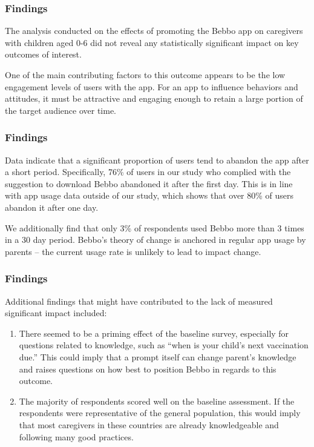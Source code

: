 \documentclass[aspectratio=169]{beamer}
\begin{document}
\begin{frame}
\frametitle{Findings}

The analysis conducted on the effects of promoting the Bebbo app on caregivers with children aged 0-6 did not reveal any statistically significant impact on key outcomes of interest. 

One of the main contributing factors to this outcome appears to be the low engagement levels of users with the app. For an app to influence behaviors and attitudes, it must be attractive and engaging enough to retain a large portion of the target audience over time. 



\end{frame}

\begin{frame}
   \frametitle{Findings}

Data indicate that a significant proportion of users tend to abandon the app after a short period. Specifically, 76\% of users in our study who complied with the suggestion to download Bebbo abandoned it after the first day. This is in line with app usage data outside of our study, which shows that over 80\% of users abandon it after one day. 

We additionally find that only 3\% of respondents used Bebbo more than 3 times in a 30 day period. Bebbo’s theory of change is anchored in regular app usage by parents – the current usage rate is unlikely to lead to impact change.

\end{frame}

\begin{frame}
   \frametitle{Findings}
  Additional findings that might have contributed to the lack of measured significant impact included: 

  \begin{enumerate}
  \item There seemed to be a priming effect of the baseline survey, especially for questions related to knowledge, such as “when is your child’s next vaccination due.” This could imply that a prompt itself can change parent’s knowledge and raises questions on how best to position Bebbo in regards to this outcome. 
  \item The majority of respondents scored well on the baseline assessment. If the respondents were representative of the general population, this would imply that most caregivers in these countries are already knowledgeable and following many good practices.
  \end{enumerate}
    
\end{frame}
\end{document}
